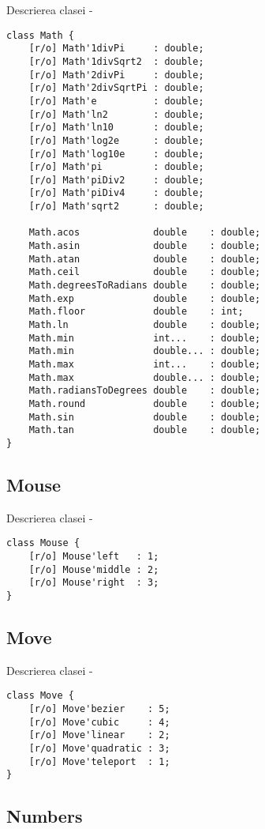 \noindent Descrierea clasei  -
\begin{lstlisting}[numbers=none]
class Math {
	[r/o] Math'1divPi     : double;
	[r/o] Math'1divSqrt2  : double;
	[r/o] Math'2divPi     : double;
	[r/o] Math'2divSqrtPi : double;
	[r/o] Math'e          : double;
	[r/o] Math'ln2        : double;
	[r/o] Math'ln10       : double;
	[r/o] Math'log2e      : double;
	[r/o] Math'log10e     : double;
	[r/o] Math'pi         : double;
	[r/o] Math'piDiv2     : double;
	[r/o] Math'piDiv4     : double;
	[r/o] Math'sqrt2      : double;
	
	Math.acos             double    : double;
	Math.asin             double    : double;
	Math.atan             double    : double;
	Math.ceil             double    : double;
	Math.degreesToRadians double    : double;
	Math.exp              double    : double;
	Math.floor            double    : int;
	Math.ln               double    : double;
	Math.min              int...    : double;
	Math.min              double... : double;
	Math.max              int...    : double;
	Math.max              double... : double;
	Math.radiansToDegrees double    : double;
	Math.round            double    : double;
	Math.sin              double    : double;
	Math.tan              double    : double;
}
\end{lstlisting}

\subsection{{\color{orange} Mouse}}

\noindent Descrierea clasei  -
\begin{lstlisting}[numbers=none]
class Mouse {
	[r/o] Mouse'left   : 1;
	[r/o] Mouse'middle : 2;
	[r/o] Mouse'right  : 3;
}
\end{lstlisting}

\subsection{{\color{orange} Move}}

\noindent Descrierea clasei  -
\begin{lstlisting}[numbers=none]
class Move {
	[r/o] Move'bezier    : 5;
	[r/o] Move'cubic     : 4;
	[r/o] Move'linear    : 2;
	[r/o] Move'quadratic : 3;
	[r/o] Move'teleport  : 1;
}
\end{lstlisting}

\subsection{{\color{orange} Numbers}}

